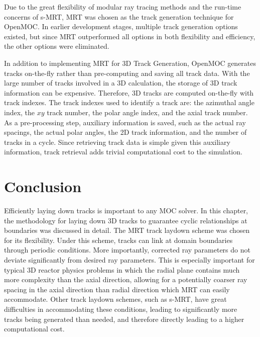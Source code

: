 Due to the great flexibility of modular ray tracing methods and the run-time concerns of \ac{s-MRT}, \ac{MRT} was chosen as the track generation technique for OpenMOC. In earlier development stages, multiple track generation options existed, but since \ac{MRT} outperformed all options in both flexibility and efficiency, the other options were eliminated.

In addition to implementing \ac{MRT} for 3D Track Generation, OpenMOC generates tracks on-the-fly rather than pre-computing and saving all track data. With the large number of tracks involved in a 3D calculation, the storage of 3D track information can be expensive. Therefore, 3D tracks are computed on-the-fly with track indexes. The track indexes used to identify a track are: the azimuthal angle index, the $xy$ track number, the polar angle index, and the axial track number. As a pre-processing step, auxiliary information is saved, such as the actual ray spacings, the actual polar angles, the 2D track information, and the number of tracks in a cycle. Since retrieving track data is simple given this auxiliary information, track retrieval adds trivial computational cost to the simulation.

\section{Conclusion}
\label{sec:tg-conclusion}

Efficiently laying down tracks is important to any \ac{MOC} solver. In this chapter, the methodology for laying down 3D tracks to guarantee cyclic relationships at boundaries was discussed in detail. The \ac{MRT} track laydown scheme was chosen for its flexibility. Under this scheme, tracks can link at domain boundaries through periodic conditions. More importantly, corrected ray parameters do not deviate significantly from desired ray parameters. This is especially important for typical 3D reactor physics problems in which the radial plane contains much more complexity than the axial direction, allowing for a potentially coarser ray spacing in the axial direction than radial direction which \ac{MRT} can easily accommodate. Other track laydown schemes, such as \ac{s-MRT}, have great difficulties in accommodating these conditions, leading to significantly more tracks being generated than needed, and therefore directly leading to a higher computational cost. 


